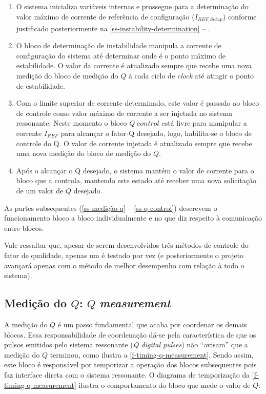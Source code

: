 \begin{enumerate}
    \item O sistema inicializa variáveis internas e prossegue para a determinação do valor máximo de corrente de referência de configuração ($I_{REF_|{Setup}}$) conforme justificado posteriormente na \autoref{ss-instability-determination} -- .
    \item O bloco de determinação de instabilidade manipula a corrente de configuração do sistema até determinar onde é o ponto máximo de estabilidade. O valor da corrente é atualizado sempre que recebe uma nova medição do bloco de medição do $Q$ à cada ciclo de \textit{clock} até atingir o ponto de estabilidade.
    \item Com o limite superior de corrente determinado, este valor é passado ao bloco de controle como valor máximo de corrente a ser injetada no sistema ressonante. Neste momento o bloco $Q\; control$ está livre para manipular a corrente $I_{REF}$ para alcançar o fator-Q desejado, logo, habilita-se o bloco de controle do Q. O valor de corrente injetada é atualizado sempre que recebe uma nova medição do bloco de medição do $Q$.
    \item Após o alcançar o Q desejado, o sistema mantém o valor de corrente para o bloco que a controla, mantendo este estado até receber uma nova solicitação de um valor de $Q$ desejado.
\end{enumerate}

As partes subsequentes (\autoref{ss-medição-q} -- \autoref{ss-q-control}) descrevem o funcionamento bloco a bloco individualmente e no que diz respeito à comunicação entre blocos.

Vale ressaltar que, apesar de serem desenvolvidos três métodos de controle do fator de qualidade, apenas um é testado por vez (e posteriormente o projeto avançará apenas com o método de melhor desempenho com relação à todo o sistema).

\subsection{Medição do $Q$: $Q$ \textit{measurement}}\label{ss-medição-q}

A medição do $Q$ é um passo fundamental que acaba por coordenar os demais blocos. Essa responsabilidade de coordenação dá-se pela característica de que os pulsos emitidos pelo sistema ressonante (\textit{Q digital pulses}) não ``avisam'' que a medição do $Q$ terminou, como ilustra a \autoref{f-timing-q-measurement}. Sendo assim, este bloco é responsável por temporizar a operação dos blocos subsequentes pois faz interface direta com o sistema ressonante. O diagrama de temporização da \autoref{f-timing-q-measurement} ilustra o comportamento do bloco que mede o valor de $Q$:

